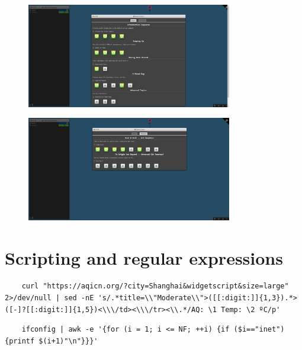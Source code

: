 \documentclass[a4paper]{article}
\begin{document}
\begin{figure}[H]
    \centering
    \includegraphics[width=0.8\textwidth]{20.png}
\end{figure}
\begin{figure}[H]
    \centering
    \includegraphics[width=0.8\textwidth]{21.png}
\end{figure}
\section{Scripting and regular expressions}
\begin{verbatim}
    curl "https://aqicn.org/?city=Shanghai&widgetscript&size=large" 2>/dev/null | sed -nE 's/.*title=\\"Moderate\\">([[:digit:]]{1,3}).*>([-]?[[:digit:]]{1,5})<\\\/td><\\\/tr><\\.*/AQ: \1 Temp: \2 ºC/p'
\end{verbatim}
\begin{verbatim}
    ifconfig | awk -e '{for (i = 1; i <= NF; ++i) {if ($i=="inet") {printf $(i+1)"\n"}}}'
\end{verbatim}
\printbibliography
\end{document}
